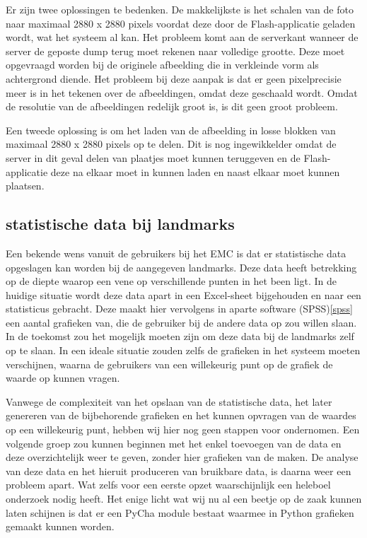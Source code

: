 Er zijn twee oplossingen te bedenken. De makkelijkste is het schalen van de foto naar maximaal 2880 x 2880 pixels voordat deze door de Flash-applicatie geladen wordt, wat het systeem al kan. Het probleem komt aan de serverkant wanneer de server de geposte dump terug moet rekenen naar volledige grootte. Deze moet opgevraagd worden bij de originele afbeelding die in verkleinde vorm als achtergrond diende. Het probleem bij deze aanpak is dat er geen pixelprecisie meer is in het tekenen over de afbeeldingen, omdat deze geschaald wordt. Omdat de resolutie van de afbeeldingen redelijk groot is, is dit geen groot probleem.

Een tweede oplossing is om het laden van de afbeelding in losse blokken van maximaal 2880 x 2880 pixels op te delen. Dit is nog ingewikkelder omdat de server in dit geval delen van plaatjes moet kunnen teruggeven en de Flash-applicatie deze na elkaar moet in kunnen laden en naast elkaar moet kunnen plaatsen.

\subsection{statistische data bij landmarks} %
Een bekende wens vanuit de gebruikers bij het EMC is dat er statistische data opgeslagen kan worden bij de aangegeven landmarks.
Deze data heeft betrekking op de diepte waarop een vene op verschillende punten in het been ligt.
In de huidige situatie wordt deze data apart in een Excel-sheet bijgehouden en naar een statisticus gebracht.
Deze maakt hier vervolgens in aparte software (SPSS)\ref{spss} een aantal grafieken van, die de gebruiker bij de andere data op zou willen slaan.
In de toekomst zou het mogelijk moeten zijn om deze data bij de landmarks zelf op te slaan.
In een ideale situatie zouden zelfs de grafieken in het systeem moeten verschijnen, waarna de gebruikers van een willekeurig punt op de grafiek de waarde op kunnen vragen.

Vanwege de complexiteit van het opslaan van de statistische data, het later genereren van de bijbehorende grafieken en het kunnen opvragen van de waardes op een willekeurig punt, hebben wij hier nog geen stappen voor ondernomen.
Een volgende groep zou kunnen beginnen met het enkel toevoegen van de data en deze overzichtelijk weer te geven, zonder hier grafieken van de maken.
De analyse van deze data en het hieruit produceren van bruikbare data, is daarna weer een probleem apart.
Wat zelfs voor een eerste opzet waarschijnlijk een heleboel onderzoek nodig heeft.
Het enige licht wat wij nu al een beetje op de zaak kunnen laten schijnen is dat er een PyCha module bestaat waarmee in Python grafieken gemaakt kunnen worden.

